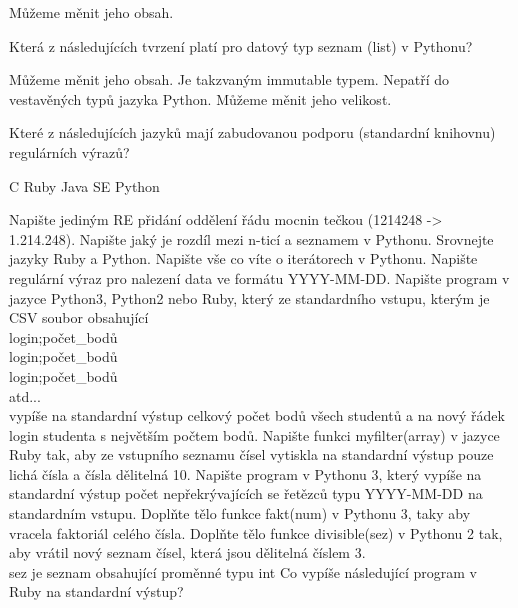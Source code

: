 \documentclass[addpoints,12pt]{exam}
\begin{document}
\begin{questions}
\begin{choices}
\choice
Můžeme měnit jeho obsah.
\end{choices}
\question[2]
Která z následujících tvrzení platí pro datový typ seznam (list) v Pythonu?
\nopagebreak
\begin{choices}
\choice
Můžeme měnit jeho obsah.
\choice
Je takzvaným immutable typem.
\choice
Nepatří do vestavěných typů jazyka Python.
\choice
Můžeme měnit jeho velikost.
\end{choices}
\question[2]
Které z následujících jazyků mají zabudovanou podporu (standardní knihovnu) regulárních výrazů?
\nopagebreak
\begin{choices}
\choice
C
\choice
Ruby
\choice
Java SE
\choice
Python
\end{choices}
\question[2]
Napište jediným RE přidání oddělení řádu mocnin tečkou (1214248 -\textgreater{} 1.214.248).
\nopagebreak
\makeemptybox{10cm}
\question[2]
Napište jaký je rozdíl mezi n-ticí a seznamem v Pythonu.
\nopagebreak
\makeemptybox{10cm}
\question[2]
Srovnejte jazyky Ruby a Python.
\nopagebreak
\makeemptybox{10cm}
\question[2]
Napište vše co víte o iterátorech v Pythonu.
\nopagebreak
\makeemptybox{10cm}
\question[2]
Napište regulární výraz pro nalezení data ve formátu YYYY-MM-DD.
\nopagebreak
\makeemptybox{10cm}
\question[2]
Napište program v jazyce Python3, Python2 nebo Ruby, který ze standardního vstupu, kterým je CSV soubor obsahující\\
login;počet\_{}bodů\\
login;počet\_{}bodů\\
login;počet\_{}bodů\\
atd...\\
vypíše na standardní výstup celkový počet bodů všech studentů a na nový řádek login studenta s největším počtem bodů.
\nopagebreak
\makeemptybox{10cm}
\question[2]
Napište funkci myfilter(array) v jazyce Ruby tak, aby ze vstupního seznamu čísel vytiskla na standardní výstup pouze lichá čísla a čísla dělitelná 10.
\nopagebreak
\makeemptybox{10cm}
\question[2]
Napište program v Pythonu 3, který vypíše na standardní výstup počet nepřekrývajících se řetězců typu YYYY-MM-DD na standardním vstupu.
\nopagebreak
\makeemptybox{10cm}
\question[2]
Doplňte tělo funkce fakt(num) v Pythonu 3, taky aby vracela faktoriál celého čísla.
\nopagebreak
\makeemptybox{10cm}
\question[2]
Doplňte tělo funkce divisible(sez) v Pythonu 2 tak, aby vrátil nový seznam čísel, která jsou dělitelná číslem 3.\\
sez je seznam obsahující proměnné typu int
\nopagebreak
\makeemptybox{10cm}
\question[2]
Co vypíše následující program v Ruby na standardní výstup?\\

\end{questions}
\end{document}
